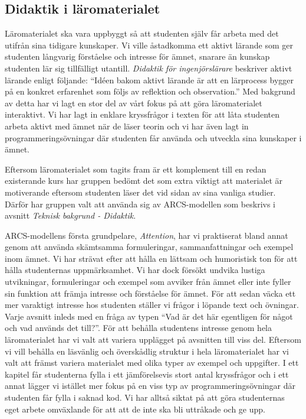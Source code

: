 \documentclass[12pt,a4paper,twoside,openright]{article}
\begin{document}
\subsection{Didaktik i läromaterialet}
\label{sec:matDidaktik}
Läromaterialet ska vara uppbyggt så att studenten själv får arbeta med
det utifrån sina tidigare kunskaper. Vi ville åstadkomma ett aktivt
lärande som ger studenten långvarig förståelse och intresse för ämnet,
snarare än kunskap studenten lär sig tillfälligt
utantill. \textit{Didaktik för ingenjörslärare}
\cite{didaktik_for_ingenjorslarare} beskriver aktivt lärande enligt
följande: ``Idéen bakom aktivt lärande är att en lärprocess bygger på
en konkret erfarenhet som följs av reflektion och observation.'' Med
bakgrund av detta har vi lagt en stor del av vårt fokus på att göra
läromaterialet interaktivt. Vi har lagt in enklare kryssfrågor i
texten för att låta studenten arbeta aktivt med ämnet när de läser
teorin och vi har även lagt in programmeringsövningar där studenten
får använda och utveckla sina kunskaper i ämnet.

Eftersom läromaterialet som tagits fram är ett komplement till en
redan existerande kurs har gruppen bedömt det som extra viktigt att
materialet är motiverande eftersom studenten läser det vid sidan av
sina vanliga studier. Därför har gruppen valt att använda sig av
ARCS-modellen som beskrivs i avsnitt \textit{Teknisk bakgrund -
  Didaktik}.

ARCS-modellens första grundpelare, \textit{Attention}, har vi
praktiserat bland annat genom att använda skämtsamma formuleringar,
sammanfattningar och exempel inom ämnet. Vi har strävat efter att
hålla en lättsam och humoristisk ton för att hålla studenternas
uppmärksamhet. Vi har dock försökt undvika lustiga utvikningar,
formuleringar och exempel som avviker från ämnet eller inte fyller sin
funktion att främja intresse och förståelse för ämnet. För att sedan
väcka ett mer varaktigt intresse hos studenten ställer vi frågor i
löpande text och övningar. Varje avsnitt inleds med en fråga av typen
``Vad är det här egentligen för något och vad används det till?''. För
att behålla studentens intresse genom hela läromaterialet har vi valt
att variera upplägget på avsnitten till viss del. Eftersom vi vill
behålla en läsvänlig och överskådlig struktur i hela läromaterialet
har vi valt att främst variera materialet med olika typer av exempel
och uppgifter. I ett kapitel får studenterna fylla i ett jämförelsevis
stort antal kryssfrågor och i ett annat lägger vi istället mer fokus
på en viss typ av programmeringsövningar där studenten får fylla i
saknad kod. Vi har alltså siktat på att göra studenternas eget arbete
omväxlande för att att de inte ska bli uttråkade och ge upp.
\end{document}
